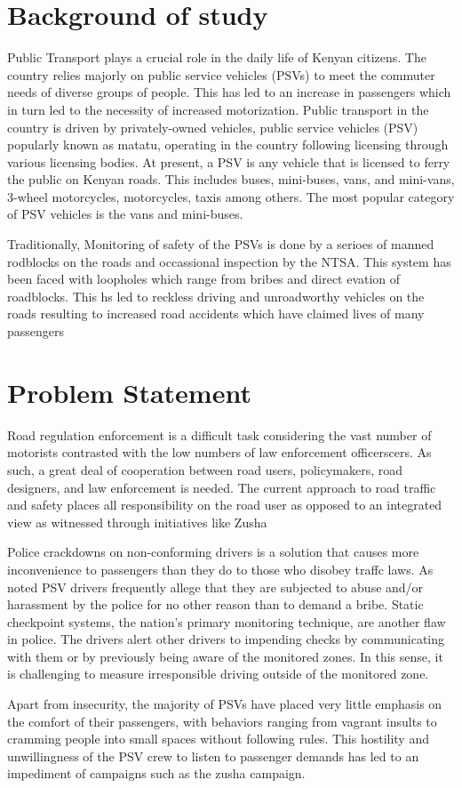 \documentclass[a4paper, 12pt]{report}
\begin{document}
\section{Background of study}
\noindent Public Transport plays a crucial role in the daily life of Kenyan citizens. The country relies majorly on public service vehicles (PSVs) to meet the commuter needs of
diverse groups of people. This has led to an increase in passengers which in turn
led to the necessity of increased motorization. Public transport in the country is
driven by privately-owned vehicles, public service vehicles (PSV) popularly known
as matatu, operating in the country following licensing through various licensing
bodies. At present, a PSV is any vehicle that is licensed to ferry the public on
Kenyan roads. This includes buses, mini-buses, vans, and mini-vans, 3-wheel motorcycles, motorcycles, taxis among others. The most popular category of PSV
vehicles is the vans and mini-buses.\par
\noindent Traditionally, Monitoring of safety of the PSVs is done by a serioes of manned
rodblocks on the roads and occassional inspection by the NTSA. This system has
been faced with loopholes which range from bribes and direct evation of roadblocks. This hs led to reckless driving and unroadworthy vehicles on the roads
resulting to increased road accidents which have claimed lives of many passengers

\section{Problem Statement}
\noindent Road regulation enforcement is a difficult task considering the vast number of
motorists contrasted with the low numbers of law enforcement officerscers. As such,
a great deal of cooperation between road users, policymakers, road designers, and
law enforcement is needed. The current approach to road traffic and safety places
all responsibility on the road user as opposed to an integrated view as witnessed
through initiatives like Zusha\par
\noindent Police crackdowns on non-conforming drivers is a solution that causes more inconvenience to passengers than they do to those who disobey traffc laws. As noted
PSV drivers frequently allege that they are subjected to abuse and/or harassment
by the police for no other reason than to demand a bribe. Static checkpoint systems, the nation's primary monitoring technique, are another flaw in police. The
drivers alert other drivers to impending checks by communicating with them or by previously being aware of the monitored zones. In this sense, it is challenging
to measure irresponsible driving outside of the monitored zone.\par 
\noindent Apart from insecurity, the majority of PSVs have placed very little emphasis on
the comfort of their passengers, with behaviors ranging from vagrant insults to
cramming people into small spaces without following rules. This hostility and
unwillingness of the PSV crew to listen to passenger demands has led to an impediment of campaigns such as the zusha campaign.
\end{document}
